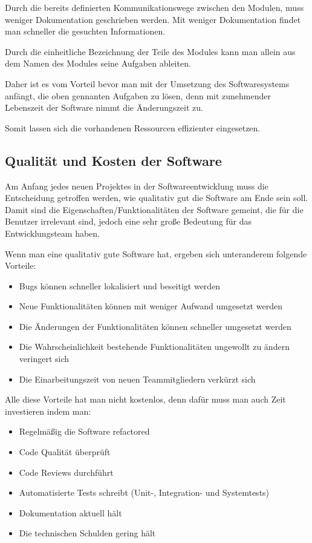 \documentclass{article}
\begin{document}
    Durch die bereits definierten Kommunikationswege zwischen den Modulen, muss weniger Dokumentation geschrieben werden.
    Mit weniger Dokumentation findet man schneller die gesuchten Informationen.

    Durch die einheitliche Bezeichnung der Teile des Modules kann man allein aus dem Namen des Modules seine Aufgaben ableiten.

    Daher ist es vom Vorteil bevor man mit der Umsetzung des Softwaresystems anfängt, die oben gennanten Aufgaben zu lösen,
    denn mit zunehmender Lebenszeit der Software nimmt die Änderungszeit zu.

    Somit lassen sich die vorhandenen Ressourcen effizienter eingesetzen.

    \newpage
    \subsection{Qualität und Kosten der Software}
    \nocite{MF_isHighQuilatySoftwareWorthTheCost}

    Am Anfang jedes neuen Projektes in der Softwareentwicklung muss die Entscheidung getroffen werden, wie qualitativ gut die Software am Ende sein soll.
    Damit sind die Eigenschaften/Funktionalitäten der Software gemeint, die für die Benutzer irrelevant sind, jedoch eine sehr große Bedeutung 
    für das Entwicklungsteam haben.
    
    Wenn man eine qualitativ gute Software hat, ergeben sich unteranderem folgende Vorteile:
    \begin{itemize}
        \item Bugs können schneller lokalisiert und beseitigt werden
        \item Neue Funktionalitäten können mit weniger Aufwand umgesetzt werden
        \item Die Änderungen der Funktionalitäten können schneller umgesetzt werden
        \item Die Wahrscheinlichkeit bestehende Funktionalitäten ungewollt zu ändern veringert sich
        \item Die Einarbeitungszeit von neuen Teammitgliedern verkürzt sich 
    \end{itemize}

    Alle diese Vorteile hat man nicht kostenlos, denn dafür muss man auch Zeit investieren indem man:
    \begin{itemize}
        \item Regelmäßig die Software refactored
        \item Code Qualität überprüft
        \item Code Reviews durchführt
        \item Automatisierte Tests schreibt (Unit-, Integration- und Systemtests)
        \item Dokumentation aktuell hält
        \item Die technischen Schulden gering hält
    \end{itemize}
\end{document}
